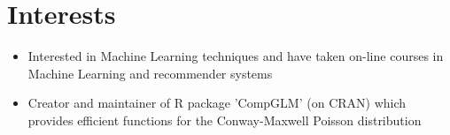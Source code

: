 \documentclass[11pt, a4paper, sans]{moderncv}
\begin{document}
\section{Interests}

\begin{itemize}
\item Interested in Machine Learning techniques and have taken on-line courses in Machine Learning and recommender
systems
\item Creator and maintainer of R package 'CompGLM' (on CRAN) which provides efficient functions for the Conway-Maxwell
Poisson distribution
\end{itemize}

\end{document}
